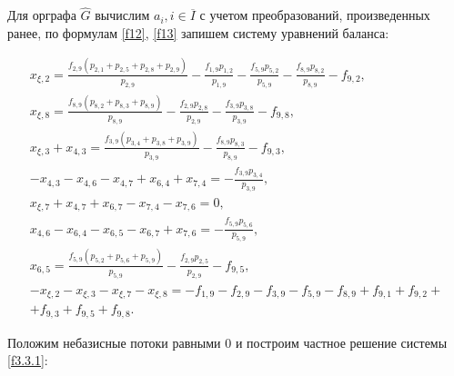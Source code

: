 \documentclass[14pt]{extarticle}%
\begin{document}
Для орграфа $\widehat{G}$ вычислим $a_i, i \in \overline{I}$ с учетом преобразований, произведенных ранее, по формулам \eqref{f12}, \eqref{f13} запишем систему уравнений баланса:

\begin{equation}\begin{gathered}\label{f3.3.1}
x_{\xi ,2}=\frac{f_{2,9} \left(p_{2,1}+p_{2,5}+p_{2,8}+p_{2,9}\right)}{p_{2,9}}-\frac{f_{1,9} p_{1,2}}{p_{1,9}}-\frac{f_{5,9} p_{5,2}}{p_{5,9}}-\frac{f_{8,9} p_{8,2}}{p_{8,9}}-f_{9,2},\\
x_{\xi ,8}=\frac{f_{8,9} \left(p_{8,2}+p_{8,3}+p_{8,9}\right)}{p_{8,9}}-\frac{f_{2,9} p_{2,8}}{p_{2,9}}-\frac{f_{3,9} p_{3,8}}{p_{3,9}}-f_{9,8},\\
x_{\xi ,3}+x_{4,3}=\frac{f_{3,9} \left(p_{3,4}+p_{3,8}+p_{3,9}\right)}{p_{3,9}}-\frac{f_{8,9} p_{8,3}}{p_{8,9}}-f_{9,3},\\
-x_{4,3}-x_{4,6}-x_{4,7}+x_{6,4}+x_{7,4}=-\frac{f_{3,9} p_{3,4}}{p_{3,9}},\\
x_{\xi ,7}+x_{4,7}+x_{6,7}-x_{7,4}-x_{7,6}=0,\\
x_{4,6}-x_{6,4}-x_{6,5}-x_{6,7}+x_{7,6}=-\frac{f_{5,9} p_{5,6}}{p_{5,9}},\\
x_{6,5}=\frac{f_{5,9} \left(p_{5,2}+p_{5,6}+p_{5,9}\right)}{p_{5,9}}-\frac{f_{2,9} p_{2,5}}{p_{2,9}}-f_{9,5},\\
-x_{\xi ,2}-x_{\xi ,3}-x_{\xi ,7}-x_{\xi ,8}=-f_{1,9}-f_{2,9}-f_{3,9}-f_{5,9}-f_{8,9}+f_{9,1}+f_{9,2}+\\+f_{9,3}+f_{9,5}+f_{9,8}.
    \end{gathered}
\end{equation}

Положим небазисные потоки равными 0 и построим частное решение системы \eqref{f3.3.1}:
\end{document}
